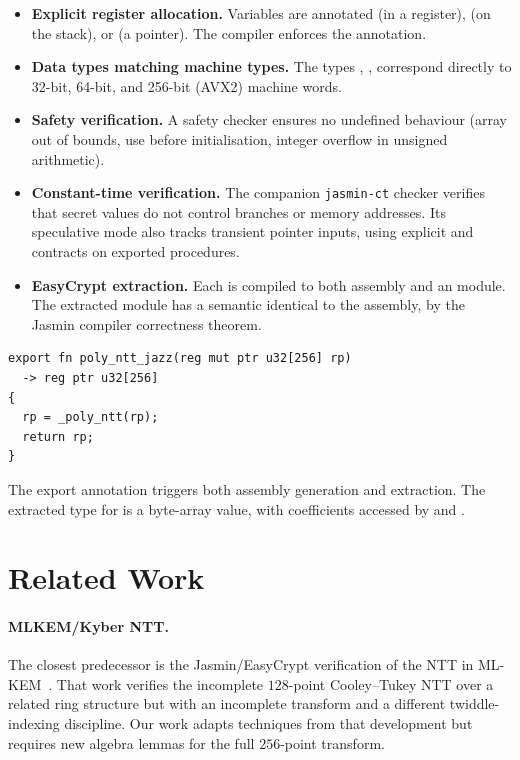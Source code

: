 \begin{itemize}
  \item \textbf{Explicit register allocation.}  Variables are annotated
         (in a register),  (on the stack), or
         (a pointer).  The compiler enforces the annotation.

  \item \textbf{Data types matching machine types.}  The types
        , ,  correspond directly to
        32-bit, 64-bit, and 256-bit (AVX2) machine words.

  \item \textbf{Safety verification.}  A safety checker ensures no
        undefined behaviour (array out of bounds, use before initialisation,
        integer overflow in unsigned arithmetic).

  \item \textbf{Constant-time verification.}  The companion
        \texttt{jasmin-ct} checker verifies that secret values do not control
        branches or memory addresses.  Its speculative mode also tracks
        transient pointer inputs, using explicit \jasm{\#[ct = "..."]} and
        \jasm{\#[sct = "..."]} contracts on exported procedures.

  \item \textbf{EasyCrypt extraction.}  Each  is compiled
        to both assembly and an \easycrypt{} module.  The extracted module has
        a semantic identical to the assembly, by the Jasmin compiler
        correctness theorem.
\end{itemize}

\begin{lstlisting}[language=Jasmin, caption={Jasmin function signature example}]
export fn poly_ntt_jazz(reg mut ptr u32[256] rp)
  -> reg ptr u32[256]
{
  rp = _poly_ntt(rp);
  return rp;
}
\end{lstlisting}

The export annotation triggers both assembly generation and \easycrypt{}
extraction.  The extracted \easycrypt{} type for  is a
 byte-array value, with coefficients accessed by
 and .

\section{Related Work}

\paragraph{MLKEM/Kyber NTT.}
The closest predecessor is the Jasmin/EasyCrypt verification of the NTT in
ML-KEM~\cite{Barbosa2023}.  That work verifies the incomplete $128$-point
Cooley--Tukey NTT over a related ring structure but with an incomplete
transform and a different twiddle-indexing discipline.  Our work adapts
techniques from that development but requires new algebra lemmas for the
full $256$-point transform.

